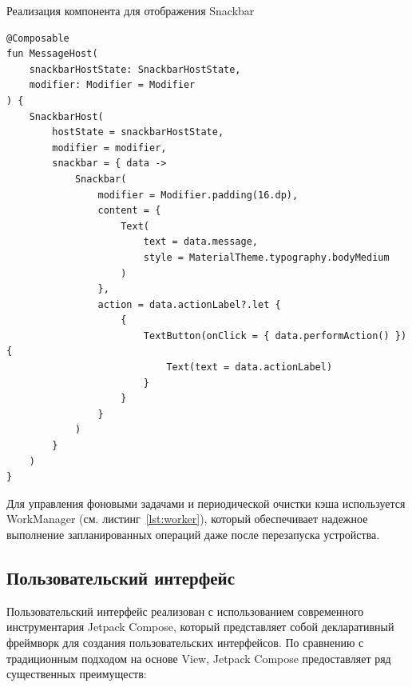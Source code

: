 \documentclass[14pt, russian]{scrartcl}
\begin{document}
\begin{listing}[!htb]
\caption{Реализация компонента для отображения Snackbar}
\label{lst:snackbar}
\begin{verbatim}
@Composable
fun MessageHost(
    snackbarHostState: SnackbarHostState,
    modifier: Modifier = Modifier
) {
    SnackbarHost(
        hostState = snackbarHostState,
        modifier = modifier,
        snackbar = { data ->
            Snackbar(
                modifier = Modifier.padding(16.dp),
                content = {
                    Text(
                        text = data.message,
                        style = MaterialTheme.typography.bodyMedium
                    )
                },
                action = data.actionLabel?.let {
                    {
                        TextButton(onClick = { data.performAction() }) {
                            Text(text = data.actionLabel)
                        }
                    }
                }
            )
        }
    )
}
\end{verbatim}
\end{listing}

Для управления фоновыми задачами и периодической очистки кэша используется WorkManager (см. листинг~\ref{lst:worker}), который обеспечивает надежное выполнение запланированных операций даже после перезапуска устройства.

\subsection{Пользовательский интерфейс}\label{sect:ui}

Пользовательский интерфейс реализован с использованием современного инструментария Jetpack Compose, который представляет собой декларативный фреймворк для создания пользовательских интерфейсов. По сравнению с традиционным подходом на основе View, Jetpack Compose предоставляет ряд существенных преимуществ:
\end{document}
